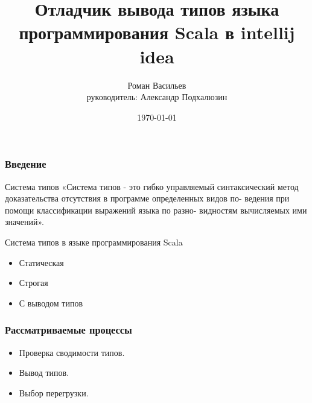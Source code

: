 \documentclass{beamer}
\title[отладчик типов scala]{Отладчик вывода типов языка программирования Scala в intellij idea}
\author[Роман Васильев]{
Роман Васильев \\ руководитель: Александр Подхалюзин
}
\institute[АУ]
{
Академический университет
}
\date{\today}
\begin{document}
\begin{frame}
\titlepage
\end{frame}


%

\begin{frame}
\frametitle{Введение}
\begin{block}{Система типов}
«Система типов - это гибко управляемый синтаксический метод
доказательства отсутствия в программе определенных видов по-
ведения при помощи классификации выражений языка по разно-
видностям вычисляемых ими значений».
\end{block}

Система типов в языке программирования Scala
\begin{itemize}
  \item Статическая
  \item Строгая
  \item С выводом типов
\end{itemize}
\end{frame}

\begin{frame}
\frametitle{Рассматриваемые процессы}
\begin{itemize}
  \item Проверка сводимости типов.
  \item Вывод типов.
  \item Выбор перегрузки.
\end{itemize}
\end{frame}
\end{document}
